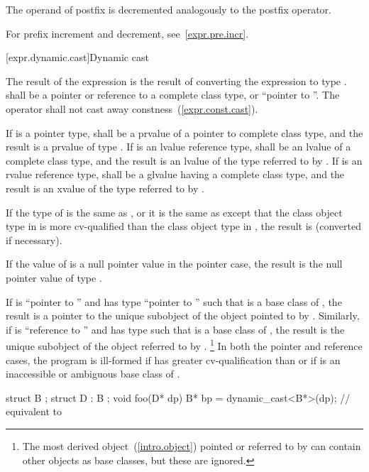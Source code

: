 \pnum
{}%
%
%
%
The operand of postfix \tcode{\dcr} is decremented analogously to the
postfix \tcode{++} operator.
\begin{note}
For prefix increment and decrement, see~\ref{expr.pre.incr}.
\end{note}

[expr.dynamic.cast]{Dynamic cast}

\pnum
{}%
%
The result of the expression  is the result of
converting the expression  to type .
%
 shall be a pointer or reference to a complete class type, or
``pointer to  ''. The  operator shall not cast
away constness~(\ref{expr.const.cast}).

\pnum
If  is a pointer type,  shall be a prvalue of a
pointer to complete class type, and the result is a prvalue of type
. If  is an lvalue reference type,  shall be
an lvalue of a complete class type, and the result is an lvalue of the
type referred to by . If  is an rvalue reference type,
 shall be a glvalue having a complete class type, and the
result is an xvalue of the type referred to by .

\pnum
If the type of  is the same as , or it is
the same as  except that the class object type in  is
more cv-qualified than the class object type in , the result is
 (converted if necessary).

\pnum
If the value of  is a null pointer value in the pointer case,
the result is the null pointer value of type .

\pnum
If  is ``pointer to  '' and  has
type ``pointer to  '' such that  is a base
class of , the result is a pointer to the unique 
subobject of the  object pointed to by . Similarly, if
 is ``reference to  '' and  has
type   such that  is a base class of
, the result is the unique  subobject of the 
object referred to by .
\footnote{The most derived object~(\ref{intro.object}) pointed or referred to by
 can contain other  objects as base classes, but these
are ignored.}
In both the pointer and
reference cases, the program is ill-formed if  has greater
cv-qualification than  or if  is an inaccessible or
ambiguous base class of .
\begin{example}

\begin{codeblock}
struct B { };
struct D : B { };
void foo(D* dp) {
  B*  bp = dynamic_cast<B*>(dp);    // equivalent to 
}
\end{codeblock}
\end{example}

